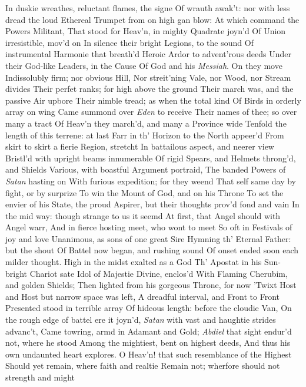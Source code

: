 \documentclass[11pt]{book}
\newcounter {first}
\newcounter {last}
\begin{document}
In duskie wreathes, reluctant flames, the signe 
Of wrauth awak't: nor with less dread the loud 
Ethereal Trumpet from on high gan blow: 
At which command the Powers Militant, 
That stood for Heav'n, in mighty Quadrate joyn'd 
Of Union irresistible, mov'd on 
In silence their bright Legions, to the sound 
Of instrumental Harmonie that breath'd 
Heroic Ardor to advent'rous deeds 
Under their God-like Leaders, in the Cause 
Of God and his \textit{Messiah}.  On they move 
Indissolubly firm; nor obvious Hill, 
Nor streit'ning Vale, nor Wood, nor Stream divides 
Their perfet ranks; for high above the ground 
Their march was, and the passive Air upbore 
Their nimble tread; as when the total kind 
Of Birds in orderly array on wing 
Came summond over \textit{Eden} to receive 
Their names of thee; so over many a tract 
Of Heav'n they march'd, and many a Province wide 
Tenfold the length of this terrene: at last 
Farr in th' Horizon to the North appeer'd 
From skirt to skirt a fierie Region, stretcht 
In battailous aspect, and neerer view 
Bristl'd with upright beams innumerable 
Of rigid Spears, and Helmets throng'd, and Shields 
Various, with boastful Argument portraid, 
The banded Powers of \textit{Satan} hasting on 
With furious expedition; for they weend 
That self same day by fight, or by surprize 
To win the Mount of God, and on his Throne 
To set the envier of his State, the proud 
Aspirer, but their thoughts prov'd fond and vain 
In the mid way: though strange to us it seemd 
At first, that Angel should with Angel warr, 
And in fierce hosting meet, who wont to meet 
So oft in Festivals of joy and love 
Unanimous, as sons of one great Sire 
Hymning th' Eternal Father: but the shout 
Of Battel now began, and rushing sound 
Of onset ended soon each milder thought. 
High in the midst exalted as a God 
Th' Apostat in his Sun-bright Chariot sate 
Idol of Majestie Divine, enclos'd 
With Flaming Cherubim, and golden Shields; 
Then lighted from his gorgeous Throne, for now 
'Twixt Host and Host but narrow space was left, 
A dreadful interval, and Front to Front 
Presented stood in terrible array 
Of hideous length: before the cloudie Van, 
On the rough edge of battel ere it joyn'd, 
\textit{Satan} with vast and haughtie strides advanc't, 
Came towring, armd in Adamant and Gold; 
\textit{Abdiel} that sight endur'd not, where he stood 
Among the mightiest, bent on highest deeds, 
And thus his own undaunted heart explores. 
\quad O Heav'n! that such resemblance of the Highest 
Should yet remain, where faith and realtie 
Remain not; wherfore should not strength and might 
\end{document}
